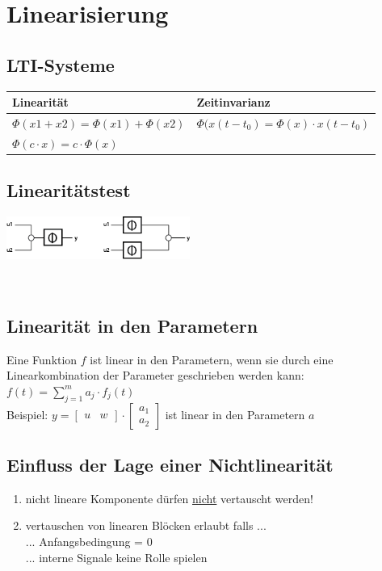 \section{Linearisierung }
	\begin{minipage}[c]{10cm}
		\subsection{LTI-Systeme }
			\renewcommand{\arraystretch}{1.5}
			\begin{tabular}{|l|l|}
				\hline
				\textbf{Linearität} & \textbf{Zeitinvarianz}\\
				\hline
				$\Phi(x1+x2)=\Phi(x1)+\Phi(x2)$ & $\Phi(x(t-t_0)=\Phi(x)\cdot x(t-t_0)$ \\
				$\Phi(c\cdot x)=c\cdot \Phi(x)$ & \\
				\hline    
			\end{tabular}
			\renewcommand{\arraystretch}{1}
		\end{minipage}
		\begin{minipage}[c]{6cm}
			\subsection{Linearitätstest }
			\includegraphics[width=6cm]{bilder/linearitaetstest}
		\end{minipage} \\
		
	\subsection{Linearität in den Parametern}
		Eine Funktion $f$ ist linear in den Parametern, wenn sie durch eine Linearkombination der Parameter geschrieben werden kann: \\
		$f(t) = \sum\limits_{j=1}^m a_j \cdot f_j(t)$ \\
		Beispiel: $y = \left[\begin{matrix} u & w \end{matrix} \right] \cdot \left[\begin{matrix} a_1 \\ a_2 \end{matrix}\right]$ ist linear in den Parametern $a$
	
	\subsection{Einfluss der Lage einer Nichtlinearität}
		\begin{enumerate}
			\item	nicht lineare Komponente dürfen \underline{nicht} vertauscht werden!\\
			\item vertauschen von linearen Blöcken erlaubt falls ...\\
								... Anfangsbedingung = 0\\
								... interne Signale keine Rolle spielen
		\end{enumerate}
	  	
